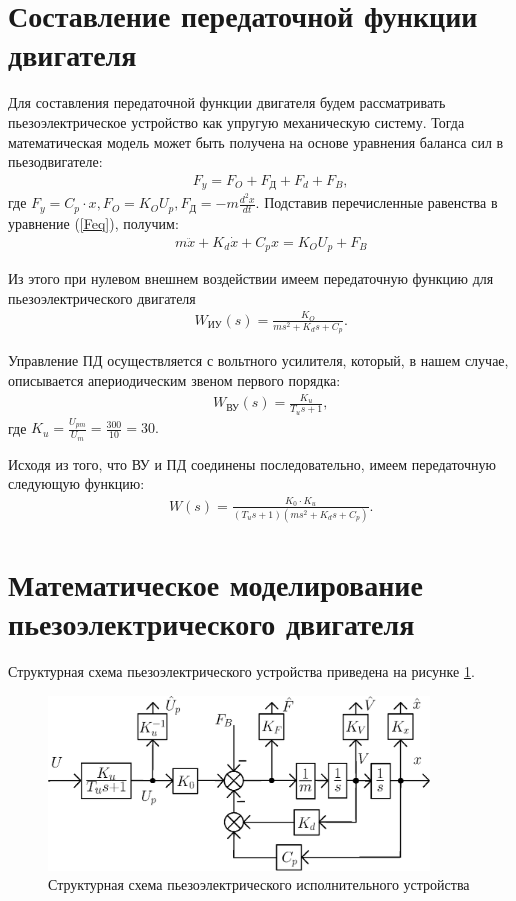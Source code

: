 \documentclass[fleqn, a4paper, 11pt, russian]{article}
\begin{document}
	\section{Составление передаточной функции двигателя}
	Для составления передаточной функции двигателя будем рассматривать пьезоэлектрическое устройство как упругую механическую систему. Тогда математическая модель может быть получена на основе уравнения баланса сил в пьезодвигателе:
	\begin{align}
		&&F_y = F_O + F_\text{Д} + F_d + F_B,
		\label{Feq}
	\end{align}
	где $F_y = C_p\cdot x, F_O = K_OU_p, F_\text{Д} = -m\displaystyle{\frac{d^2x}{d t}}$. Подставив перечисленные равенства в уравнение (\ref{Feq}), получим:
	\begin{align}
		&&m\ddot{x} + K_d\dot{x} + C_px = K_OU_p + F_B
	\end{align}
	
	Из этого при нулевом внешнем воздействии имеем передаточную функцию для пьезоэлектрического двигателя
	\begin{align} \label{Wpz}
		&&W_\text{ИУ}(s) = \displaystyle{\frac{K_O}{ms^2 + K_ds + C_p}}.
	\end{align}
	
	Управление ПД осуществляется с вольтного усилителя, который, в нашем случае, описывается апериодическим звеном первого порядка:
	\begin{align}
		&&W_\text{ВУ}(s) = \frac{K_u}{T_us + 1},
	\end{align}
	где $K_u = \displaystyle{\frac{U_{pm}}{U_m}} = \frac{300}{10} = 30.$
	
	Исходя из того, что ВУ и ПД соединены последовательно, имеем передаточную следующую функцию:
	\begin{align}
		&&W(s) = \frac{K_0\cdot K_u}{(T_us + 1)(ms^2 + K_ds + C_p)}.
	\end{align}
	\clearpage
	\section{Математическое моделирование пьезоэлектрического двигателя}
	Структурная схема пьезоэлектрического устройства приведена на рисунке \ref{StrScheme}.
	\begin{figure}[ht!]
		\centering
		\includegraphics[width = 0.9\textwidth]{Model/structScheme}
		\caption{Структурная схема пьезоэлектрического исполнительного устройства}
		\label{StrScheme}
	\end{figure}
	
\end{document}
